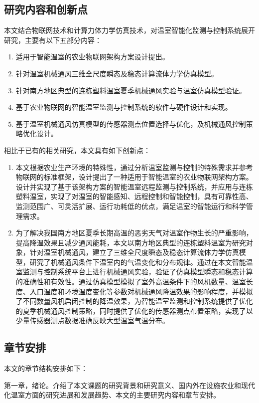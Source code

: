 	\subsection{研究内容和创新点}
	本文结合物联网技术和计算力体力学仿真技术，对温室智能化监测与控制系统展开研究，主要有以下五部分内容：
		\begin{enumerate}
  			\item 适用于智能温室的农业物联网架构方案设计提出。
  			\item 针对温室机械通风三维全尺度瞬态及稳态计算流体力学仿真模型。
  			\item 针对南方地区典型的连栋塑料温室夏季机械通风实验与温室仿真模型验证。
  			\item 基于农业物联网的智能温室监测与控制系统的软件与硬件设计和实现。
  			\item 基于温室机械通风仿真模型的传感器测点位置选择与优化，及机械通风控制策略优化设计。
		\end{enumerate}
	相比于已有的相关研究，本文具有如下创新点：
		\begin{enumerate}
  			\item 本文根据农业生产环境的特殊性，通过分析温室监测与控制的特殊需求并参考物联网的标准框架，设计提出了一种适用于智能温室的农业物联网架构方案。设计并实现了基于该架构方案的智能温室远程监测与控制系统，并应用与连栋塑料温室，实现了对温室的智能感知、远程控制和智能控制，具有可靠性高、监测范围广、可灵活扩展、运行功耗低的优点，满足温室的智能运行和科学管理需求。
  			\item 为了解决我国南方地区夏季长期高温的恶劣天气对温室作物生长的严重影响，提高降温效果且减少通风能耗，本文以南方地区典型的连栋塑料温室为研究对象，针对温室机械通风，建立了三维全尺度瞬态及稳态计算流体力学仿真模型，研究了机械通风条件下温室内的气温变化和分布规律。通过在本文智能温室监测与控制系统平台上进行机械通风实验，验证了仿真模型瞬态和稳态计算的准确性和有效性。通过仿真模型模拟了室外高温条件下的风机数量、温室长度、入口温度和环境温度变化等参数对机械通风降温效果的影响程度，并模拟了不同数量风机启闭控制的降温效果，为智能温室监测和控制系统提供了优化的夏季机械通风控制策略，同时提供了优化的传感器测点布置策略，实现了以少量传感器测点数据准确反映大型温室气温分布。
		\end{enumerate}	
	\subsection{章节安排}
	本文的章节结构安排如下：
	
	第一章，绪论。介绍了本文课题的研究背景和研究意义、国内外在设施农业和现代化温室方面的研究进展和发展趋势、本文的主要研究内容和章节安排。
	
